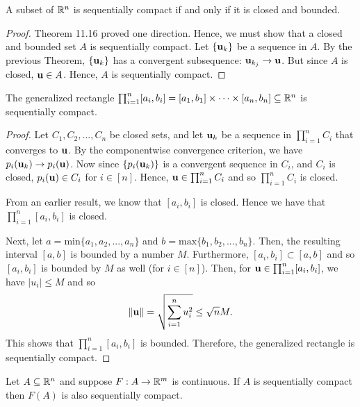 \documentclass[letterpaper, twoside, 12pt]{book}
\begin{document}
\begin{theorem}
  A subset of \(\mathbb R^n\) is sequentially compact if and only if
  it is closed and bounded.
\end{theorem}

\begin{proof}
    Theorem 11.16 proved one direction. Hence, we must show that 
    a closed and bounded set \(A\) is sequentially compact. Let
    \(\{\mathbf u_k\}\) be a sequence in \(A\). By the previous Theorem,
    \(\{\mathbf u_k\}\) has a convergent subsequence: \(\mathbf u_{k_j} \to \mathbf u\).
    But since \(A\) is closed, \(\mathbf u \in A\). Hence, \(A\)
    is sequentially compact.
\end{proof}

\begin{corollary}[11.19]
  The generalized rectangle
  \(\prod_{i=1}^n[a_i,b_i]=[a_1,b_1]\times\dots\times[a_n,b_n]\subseteq\mathbb R^n\)
  is sequentially compact.
\end{corollary}

\begin{proof}
    Let \(C_1, C_2, ... , C_n\) be closed sets, and let \(\mathbf u_k\) be 
    a sequence in \(\prod_{i=1}^n C_i \) that converges to \(\mathbf u\). 
    By the componentwise convergence criterion, we have 
    \(p_i(\mathbf u_k) \to p_i(\mathbf u)\). Now since \(\{p_i(\mathbf u_k)\}\)
    is a convergent sequence in \(C_i\), and \(C_i\) is closed, 
    \(p_i(\mathbf u) \in C_i\) for \(i \in [n]\). Hence, \(\mathbf u \in \prod_{i=1}^n C_i\)
    and so \(\prod_{i = 1}^n C_i\) is closed.

    From an earlier result, we know that \([a_i, b_i]\) is closed. Hence
    we have that \(\prod_{i = 1}^n [a_i, b_i]\) is closed. 

    Next, let \(a = \text{min}\{a_1, a_2, ..., a_n\}\) and 
    \(b = \text{max}\{b_1, b_2, ..., b_n\}\). Then, the resulting interval
    \([a, b]\) is bounded by a number \(M\). Furthermore, 
    \([a_i, b_i] \subset [a,b]\) and so \([a_i, b_i]\) is bounded by \(M\)
    as well (for \(i \in [n]\)). Then, for \(\mathbf u \in \prod_{i=1}^n [a_i, b_i]\),
    we have \(|u_i| \leq M\) and so
    \[ \|\mathbf u\| = \sqrt{ \sum_{i = 1}^n u_i^2 } \leq \sqrt{n} M . \]
    This shows that \(\prod_{i=1}^n [a_i, b_i]\) is bounded. Therefore, the
    generalized rectangle is sequentially compact.
\end{proof}

\begin{theorem}[11.20]
  Let \(A\subseteq\mathbb R^n\) and suppose \(F:A\to\mathbb R^m\) is continuous.
  If \(A\) is sequentially compact then \(F(A)\) is also sequentially
  compact.
\end{theorem}
\end{document}
